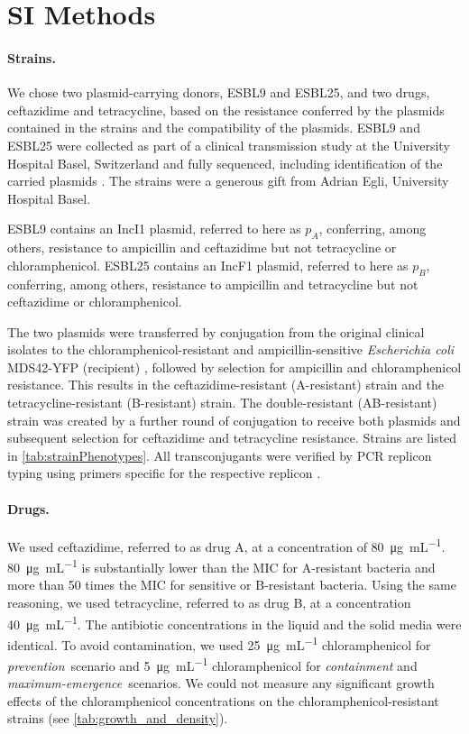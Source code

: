 \section{SI Methods\label{ssec:si_methods}}

\paragraph{Strains.}
We chose two plasmid-carrying donors, ESBL9 and ESBL25, and two drugs, ceftazidime and tetracycline, based on the resistance conferred by the plasmids contained in the strains and the compatibility of the plasmids.
ESBL9 and ESBL25 were collected as part of a clinical transmission study at the University Hospital Basel, Switzerland \cite{Sutter2016} and fully sequenced, including identification of the carried plasmids \cite{Huisman2022}.
The strains were a generous gift from Adrian Egli, University Hospital Basel.

ESBL9 contains an IncI1 plasmid, referred to here as $p_A$, conferring, among others, resistance to ampicillin and ceftazidime but not tetracycline or chloramphenicol.
ESBL25 contains an IncF1 plasmid, referred to here as $p_B$, conferring, among others, resistance to ampicillin and tetracycline but not ceftazidime or chloramphenicol.

The two plasmids were transferred by conjugation from the original clinical isolates to the chloramphenicol-resistant and ampicillin-sensitive \textit{Escherichia coli} MDS42-YFP (recipient) \cite{Feher2012}, followed by selection for ampicillin and chloramphenicol resistance.
This results in the ceftazidime-resistant (A-resistant) strain and the tetracycline-resistant (B-resistant) strain.
The double-resistant (AB-resistant) strain was created by a further round of conjugation to receive both plasmids and subsequent selection for ceftazidime and tetracycline resistance.
Strains are listed in \autoref{tab:strainPhenotypes}.
All transconjugants were verified by PCR replicon typing using primers specific for the respective replicon \cite{Carattoli2005}.

\paragraph{Drugs.}
We used ceftazidime, referred to as drug A, at a concentration of \SI{80}{\micro\gram\per\milli\liter}.
\SI{80}{\micro\gram\per\milli\liter} is substantially lower than the MIC for A-resistant bacteria and more than 50 times the MIC for sensitive or B-resistant bacteria.
Using the same reasoning, we used tetracycline, referred to as drug B, at a concentration \SI{40}{\micro\gram\per\milli\liter}.
The antibiotic concentrations in the liquid and the solid media were identical.
To avoid contamination, we used \SI{25}{\micro\gram\per\milli\liter} chloramphenicol for \textit{prevention}~scenario and \SI{5}{\micro\gram\per\milli\liter} chloramphenicol for \textit{containment} and \textit{maximum-emergence}~scenarios.
We could not measure any significant growth effects of the chloramphenicol concentrations on the chloramphenicol-resistant strains (see \autoref{tab:growth_and_density}).

